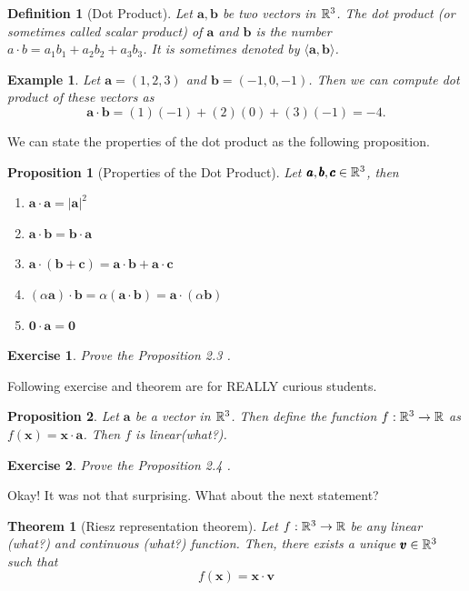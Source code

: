 \documentclass[12pt]{article}
\newtheorem{thm}{Theorem}[section]
\newtheorem{defn}{Definition}[section]
\newtheorem{proposition}{Proposition}[section]
\newtheorem{exercise}{Exercise}[section]
\newtheorem{example}{Example}[section]
\begin{document}
\begin{defn}[Dot Product]
  Let $\pmb{a}, \pmb{b}$ be two vectors in $\mathbb{R}^3$. The dot product (or sometimes called scalar product)
  of $\pmb{a}$ and $\pmb{b}$ is the number $a \cdot b = a_1b_1 + a_2b_2 + a_3b_3$. It is 
  sometimes denoted by $\langle \pmb{a}, \pmb{b}\rangle$.
\end{defn}

\begin{example}
  Let $\pmb{a} = (1,2,3)$ and $\pmb{b} = (-1, 0, -1)$. Then we can compute dot product of these vectors as
  $$ \pmb{a} \cdot \pmb{b} = (1)(-1) + (2)(0) + (3)(-1) = -4 .$$
\end{example}

We can state the properties of the dot product as the following proposition.

\begin{proposition}[Properties of the Dot Product]
  Let $\pmb{a},\pmb{b}, \pmb{c} \in \mathbb{R}^3$, then
  \begin{enumerate}
    \item $\pmb{a} \cdot \pmb{a} = |\pmb{a}|^2$
    \item $\pmb{a} \cdot \pmb{b} = \pmb{b} \cdot \pmb{a}$
    \item $\pmb{a} \cdot (\pmb{b} + \pmb{c}) = \pmb{a} \cdot \pmb{b} + \pmb{a} \cdot \pmb{c}$
    \item $(\alpha \pmb{a}) \cdot \pmb{b} = \alpha(\pmb{a} \cdot \pmb{b}) = \pmb{a} \cdot (\alpha \pmb{b})$
    \item $\pmb{0} \cdot \pmb{a} = \pmb{0}$
  \end{enumerate}
\end{proposition}

\begin{exercise}
  Prove the Proposition 2.3 .
\end{exercise}

Following exercise and theorem are for REALLY curious students.
\begin{proposition}
  Let $\pmb{a}$ be a vector in $\mathbb{R}^3$. Then define the function 
  $f:\mathbb{R}^3 \rightarrow \mathbb{R}$ as
  $f(\pmb{x}) = \pmb{x} \cdot \pmb{a}$. Then $f$ is linear(what?).
\end{proposition}
\begin{exercise}
  Prove the Proposition 2.4 .
\end{exercise}

Okay! It was not that surprising. What about the next statement?
\begin{thm}[Riesz representation theorem]
  Let $f: \mathbb{R}^3 \rightarrow \mathbb{R}$ be any linear (what?) and continuous (what?) function. Then,
  there exists a unique $\pmb{v} \in \mathbb{R}^3$ such that 
  $$ f(\pmb{x}) = \pmb{x} \cdot \pmb{v} $$
\end{thm}
\end{document}
